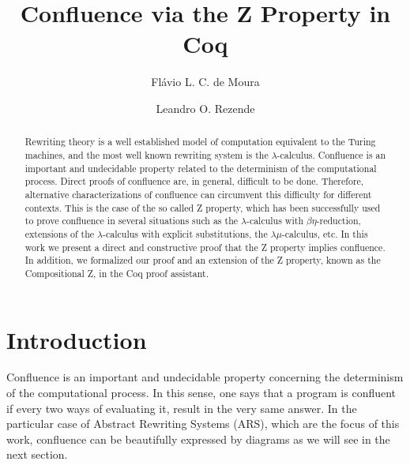 \documentclass{llncs}
\title{Confluence via the Z Property in Coq}
\author{Flávio L. C. de Moura \and Leandro O. Rezende}
\institute{Departamento de Ciência da Computação, Universidade de Brasília, Brazil\\
\email{flaviomoura@unb.br,l-ordo.ab.chao@hotmail.com}}
\begin{document}
\maketitle
  
\begin{abstract}
  Rewriting theory is a well established model of computation
  equivalent to the Turing machines, and the most well known rewriting
  system is the $\lambda$-calculus. Confluence is an important and
  undecidable property related to the determinism of the computational
  process. Direct proofs of confluence are, in general, difficult to
  be done. Therefore, alternative characterizations of confluence can
  circumvent this difficulty for different contexts. This is the case
  of the so called Z property, which has been successfully used to
  prove confluence in several situations such as the
  $\lambda$-calculus with $\beta\eta$-reduction, extensions of the
  $\lambda$-calculus with explicit substitutions, the
  $\lambda\mu$-calculus, etc. In this work we present a direct and
  constructive proof that the Z property implies confluence.  In
  addition, we formalized our proof and an extension of the Z
  property, known as the Compositional Z, in the Coq proof assistant.
\end{abstract}


\section{Introduction}

Confluence is an important and undecidable property concerning the
determinism of the computational process. In this sense, one says that
a program is confluent if every two ways of evaluating it, result in
the very same answer. In the particular case of Abstract Rewriting
Systems (ARS), which are the focus of this work, confluence can be
beautifully expressed by diagrams as we will see in the next section.
\end{document}

